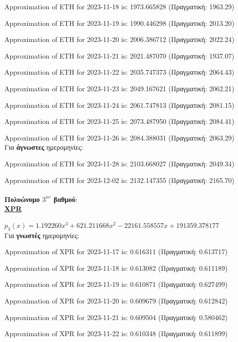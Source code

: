 \documentclass[a4paper, 14pt]{article}   %
\begin{document}
Approximation of ETH for 2023-11-18 is: 1973.665828 \small{(Πραγματική: 1963.29)}

Approximation of ETH for 2023-11-19 is: 1990.446298 \small{(Πραγματική: 2013.20)}

Approximation of ETH for 2023-11-20 is: 2006.386712 \small{(Πραγματική: 2022.24)}

Approximation of ETH for 2023-11-21 is: 2021.487070 \small{(Πραγματική: 1937.07)}

Approximation of ETH for 2023-11-22 is: 2035.747373 \small{(Πραγματική: 2064.43)}

Approximation of ETH for 2023-11-23 is: 2049.167621 \small{(Πραγματική: 2062.21)}

Approximation of ETH for 2023-11-24 is: 2061.747813 \small{(Πραγματική: 2081.15)}

Approximation of ETH for 2023-11-25 is: 2073.487950 \small{(Πραγματική: 2084.41)}

Approximation of ETH for 2023-11-26 is: 2084.388031 \small{(Πραγματική: 2063.29)}\\

Για \textbf{άγνωστες} ημερομηνίες:

Approximation of ETH for 2023-11-28 is: 2103.668027 \small{(Πραγματική: 2049.34)}

Approximation of ETH for 2023-12-02 is: 2132.147355 \small{(Πραγματική: 2165.70)}\\\\
\textbf{Πολυώνυμο $3^{ου}$ βαθμού}:\\

\textbf{\underline{XPR}}

$p_3(x) = 1.192260x^3 + 621.211668x^2 - 22161.558557x + 191359.378177$\\

Για \textbf{γνωστές} ημερομηνίες:

Approximation of XPR for 2023-11-17 is: 0.616311 \small{(Πραγματική: 0.613717)}

Approximation of XPR for 2023-11-18 is: 0.613082 \small{(Πραγματική: 0.611189)}

Approximation of XPR for 2023-11-19 is: 0.610871 \small{(Πραγματική: 0.627499)}

Approximation of XPR for 2023-11-20 is: 0.609679 \small{(Πραγματική: 0.612842)}

Approximation of XPR for 2023-11-21 is: 0.609504 \small{(Πραγματική: 0.580462)}

Approximation of XPR for 2023-11-22 is: 0.610348 \small{(Πραγματική: 0.611899)}
\end{document}
